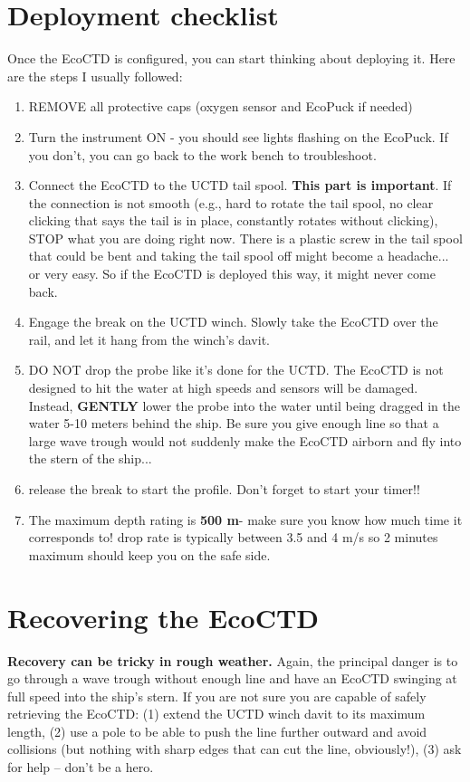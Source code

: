 \documentclass[13pt]{article}
\begin{document}
\section{Deployment checklist}
Once the EcoCTD is configured, you can start thinking about deploying it. Here are the steps I usually followed:
\begin{enumerate}
    \item REMOVE all protective caps (oxygen sensor and EcoPuck if needed)
    \item Turn the instrument ON - you should see lights flashing on the EcoPuck. If you don't, you can go back to the work bench to troubleshoot.
    \item Connect the EcoCTD to the UCTD tail spool. \textbf{This part is important}. If the connection is not smooth (e.g., hard to rotate the tail spool, no clear clicking that says the tail is in place, constantly rotates without clicking), STOP what you are doing right now. There is a plastic screw in the tail spool that could be bent and taking the tail spool off might become a headache... or very easy. So if the EcoCTD is deployed this way, it might never come back.
    \item Engage the break on the UCTD winch. Slowly take the EcoCTD over the rail, and let it hang from the winch's davit.
    \item DO NOT drop the probe like it's done for the UCTD. The EcoCTD is not designed to hit the water at high speeds and sensors will be damaged. Instead, \textbf{GENTLY} lower the probe into the water until being dragged in the water 5-10 meters behind the ship. Be sure you give enough line so that a large wave trough would not suddenly make the EcoCTD airborn and fly into the stern of the ship... 
    \item release the break to start the profile. Don't forget to start your timer!! 
    \item {\color{red} The maximum depth rating is \textbf{500 m}- make sure you know how much time it corresponds to! drop rate is typically between 3.5 and 4 m/s so 2 minutes maximum should keep you on the safe side.}
\end{enumerate}

\section{Recovering the EcoCTD}
\textbf{Recovery can be tricky in rough weather.} Again, the principal danger is to go through a wave trough without enough line and have an EcoCTD swinging at full speed into the ship's stern. If you are not sure you are capable of safely retrieving the EcoCTD: (1) extend the UCTD winch davit to its maximum length, (2) use a pole to be able to push the line further outward and avoid collisions (but nothing with sharp edges that can cut the line, obviously!), (3) ask for help -- don't be a hero.
\end{document}
